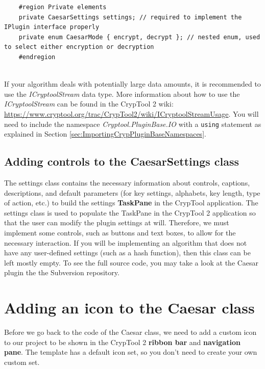 \begin{lstlisting}
	#region Private elements
	private CaesarSettings settings; // required to implement the IPlugin interface properly
	private enum CaesarMode { encrypt, decrypt }; // nested enum, used to select either encryption or decryption
	#endregion
\end{lstlisting}

\ \\
If your algorithm deals with potentially large data amounts, it is recommended to use the \textit{ICryptoolStream} data type. More information about how to use the \textit{ICryptoolStream} can be found in the CrypTool 2 wiki: \url{https://www.cryptool.org/trac/CrypTool2/wiki/ICryptoolStreamUsage}. You will need to include the namespace \textit{Cryptool.PluginBase.IO} with a \texttt{using} statement as explained in Section \ref{sec:ImportingCrypPluginBaseNamespaces}.

\subsection{Adding controls to the CaesarSettings class}
\label{sec:AddingControlsToTheCaesarSettingsClass}

The settings class contains the necessary information about controls, captions, descriptions, and default parameters (for key settings, alphabets, key length, type of action, etc.) to build the settings \textbf{TaskPane} in the CrypTool application. The settings class is used to populate the TaskPane in the CrypTool 2 application so that the user can modify the plugin settings at will. Therefore, we must implement some controls, such as buttons and text boxes, to allow for the necessary interaction. If you will be implementing an algorithm that does not have any user-defined settings (such as a hash function), then this class can be left mostly empty. To see the full source code, you may take a look at the Caesar plugin the the Subversion repository.

\section{Adding an icon to the Caesar class}
\label{sec:AddingAnIconToTheCaesarClass}

Before we go back to the code of the Caesar class, we need to add a custom icon to our project to be shown in the CrypTool 2 \textbf{ribbon bar} and \textbf{navigation pane}. The template has a default icon set, so you don't need to create your own custom set.

